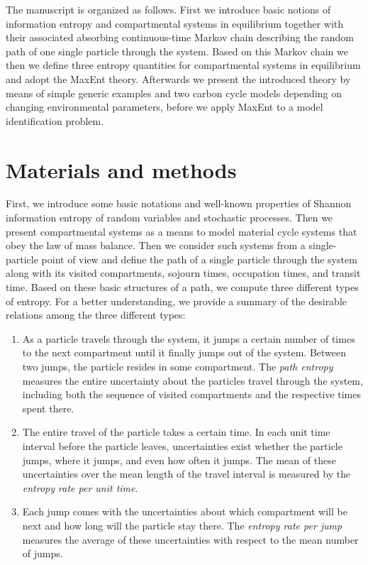 \documentclass[smallextended]{svjour3}
\begin{document}
The manuscript is organized as follows.
First we introduce basic notions of information entropy and compartmental systems in equilibrium together with their associated absorbing continuous-time Markov chain describing the random path of one single particle through the system.
Based on this Markov chain we then we define three entropy quantities for compartmental systems in equilibrium and adopt the MaxEnt theory.
Afterwards we present the introduced theory by means of simple generic examples and two carbon cycle models depending on changing environmental parameters, before we apply MaxEnt to a model identification problem.


\section{Materials and methods}
First, we introduce some basic notations and well-known properties of Shannon information entropy of random variables and stochastic processes.
Then we present compartmental systems as a means to model material cycle systems that obey the law of mass balance.
Then we consider such systems from a single-particle point of view and define the path of a single particle through the system along with its visited compartments, sojourn times, occupation times, and transit time.
Based on these basic structures of a path, we compute three different types of entropy.
For a better understanding, we provide a summary of the desirable relations among the three different types:
\begin{enumerate}[(1)]
  \item 	As a particle travels through the system, it jumps a certain number of times to the next compartment until it finally jumps out of the system.
	Between two jumps, the particle resides in some compartment.
  The \emph{path entropy} measures the entire uncertainty about the particles travel through the system, including both the sequence of visited compartments and the respective times spent there.

	\item The entire travel of the particle takes a certain time.
	In each unit time interval before the particle leaves, uncertainties exist whether the particle jumps, where it jumps, and even how often it jumps.
	The mean of these uncertainties over the mean length of the travel interval is measured by the \emph{entropy rate per unit time}.

	\item Each jump comes with the uncertainties about which compartment will be next and how long will the particle stay there.
	The \emph{entropy rate per jump} measures the average of these uncertainties with respect to the mean number of jumps.
\end{enumerate}
\end{document}
